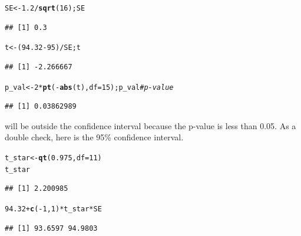 \documentclass[twoside]{book}
\makeatletter
\newcommand{\hlnum}[1]{\textcolor[rgb]{0.686,0.059,0.569}{#1}}%
\newcommand{\hlcom}[1]{\textcolor[rgb]{0.678,0.584,0.686}{\textit{#1}}}%
\newcommand{\hlopt}[1]{\textcolor[rgb]{0,0,0}{#1}}%
\newcommand{\hlstd}[1]{\textcolor[rgb]{0.345,0.345,0.345}{#1}}%
\newcommand{\hlkwb}[1]{\textcolor[rgb]{0.69,0.353,0.396}{#1}}%
\newcommand{\hlkwc}[1]{\textcolor[rgb]{0.333,0.667,0.333}{#1}}%
\newcommand{\hlkwd}[1]{\textcolor[rgb]{0.737,0.353,0.396}{\textbf{#1}}}%
\newenvironment{kframe}{%
 \def\at@end@of@kframe{}%
 \ifinner\ifhmode%
  \def\at@end@of@kframe{\end{minipage}}%
  \begin{minipage}{\columnwidth}%
 \fi\fi%
 \def\FrameCommand##1{\hskip\@totalleftmargin \hskip-\fboxsep
 \colorbox{shadecolor}{##1}\hskip-\fboxsep
     \hskip-\linewidth \hskip-\@totalleftmargin \hskip\columnwidth}%
 \MakeFramed {\advance\hsize-\width
   \@totalleftmargin\z@ \linewidth\hsize
   \@setminipage}}%
 {\par\unskip\endMakeFramed%
 \at@end@of@kframe}
\newenvironment{knitrout}{}{} %
\makeatother
\begin{document}
\begin{solution}
\begin{knitrout}
\color{fgcolor}\begin{kframe}
\begin{alltt}
\hlstd{SE} \hlkwb{<-} \hlnum{1.2} \hlopt{/} \hlkwd{sqrt}\hlstd{(}\hlnum{16}\hlstd{); SE}
\end{alltt}
\begin{verbatim}
## [1] 0.3
\end{verbatim}
\begin{alltt}
\hlstd{t} \hlkwb{<-} \hlstd{(}\hlnum{94.32} \hlopt{-} \hlnum{95}\hlstd{)} \hlopt{/} \hlstd{SE; t}
\end{alltt}
\begin{verbatim}
## [1] -2.266667
\end{verbatim}
\begin{alltt}
\hlstd{p_val} \hlkwb{<-} \hlnum{2} \hlopt{*} \hlkwd{pt}\hlstd{(} \hlopt{-} \hlkwd{abs}\hlstd{(t),} \hlkwc{df}\hlstd{=}\hlnum{15} \hlstd{); p_val}    \hlcom{# p-value}
\end{alltt}
\begin{verbatim}
## [1] 0.03862989
\end{verbatim}
\end{kframe}
\end{knitrout}
	95 will be 
	outside 
	the confidence interval because the p-value is 
	less than 0.05. 
	As a double check, here is the 95\% confidence interval.
\begin{knitrout}
\color{fgcolor}\begin{kframe}
\begin{alltt}
\hlstd{t_star} \hlkwb{<-} \hlkwd{qt}\hlstd{(}\hlnum{0.975}\hlstd{,} \hlkwc{df} \hlstd{=} \hlnum{11}\hlstd{)}
\hlstd{t_star}
\end{alltt}
\begin{verbatim}
## [1] 2.200985
\end{verbatim}
\begin{alltt}
\hlnum{94.32} \hlopt{+} \hlkwd{c}\hlstd{(}\hlopt{-}\hlnum{1}\hlstd{,} \hlnum{1}\hlstd{)} \hlopt{*} \hlstd{t_star} \hlopt{*} \hlstd{SE}
\end{alltt}
\begin{verbatim}
## [1] 93.6597 94.9803
\end{verbatim}
\end{kframe}
\end{knitrout}
\end{solution}
\end{document}
